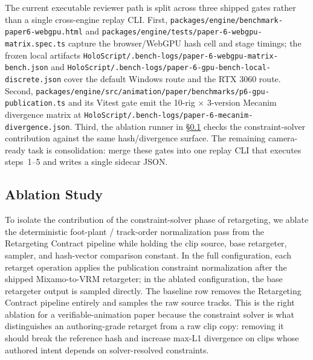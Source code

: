 \documentclass[sigconf,nonacm]{acmart}
\begin{document}
The current executable reviewer path is split across three shipped gates
rather than a single cross-engine replay CLI. First,
\texttt{packages/engine/benchmark-paper6-webgpu.html} and
\texttt{packages/engine/tests/paper-6-webgpu-matrix.spec.ts} capture
the browser/WebGPU hash cell and stage timings; the frozen local artifacts
\texttt{HoloScript/.bench-logs/paper-6-webgpu-matrix-bench.json} and
\texttt{HoloScript/.bench-logs/paper-6-gpu-bench-local-discrete.json}
cover the default Windows route and the RTX 3060 route. Second,
\texttt{packages/engine/src/animation/paper/benchmarks/p6-gpu-publication.ts}
and its Vitest gate emit the 10-rig $\times$ 3-version Mecanim
divergence matrix at
\texttt{HoloScript/.bench-logs/paper-6-mecanim-divergence.json}.
Third, the ablation runner in \S\ref{sec:ablation} checks the
constraint-solver contribution against the same hash/divergence surface.
The remaining camera-ready task is consolidation: merge these gates into
one replay CLI that executes steps~1--5 and writes a single sidecar JSON.

\subsection{Ablation Study}
\label{sec:ablation}

To isolate the contribution of the constraint-solver phase of
retargeting, we ablate the deterministic foot-plant / track-order
normalization pass from the Retargeting Contract pipeline while holding
the clip source, base retargeter, sampler, and hash-vector comparison
constant. In the full configuration, each retarget operation applies the
publication constraint normalization after the shipped Mixamo-to-VRM
retargeter; in the ablated configuration, the base retargeter output is
sampled directly. The baseline row removes the Retargeting Contract
pipeline entirely and samples the raw source tracks. This is the right
ablation for a verifiable-animation paper because the constraint solver
is what distinguishes an authoring-grade retarget from a raw clip copy:
removing it should break the reference hash and increase max-L1
divergence on clips whose authored intent depends on solver-resolved
constraints.
\end{document}

